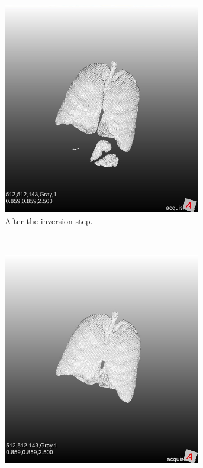 \documentclass[a4paper,10pt]{article}
\numberwithin{equation}{section} %
\numberwithin{figure}{section} %
\numberwithin{table}{section} %
\begin{document}
\begin{figure}[h]
    ~ %
    \begin{subfigure}[b]{0.45\textwidth}
        \includegraphics[width=0.95\textwidth]{lungs_with_meuk}
        \caption{After the inversion step.}
        \label{fig:lung-meuk}
    \end{subfigure}
    ~ %
    \begin{subfigure}[b]{0.45\textwidth}
        \includegraphics[width=0.95\textwidth]{lungs_without_meuk}

\end{subfigure}
\end{figure}
\end{document}
